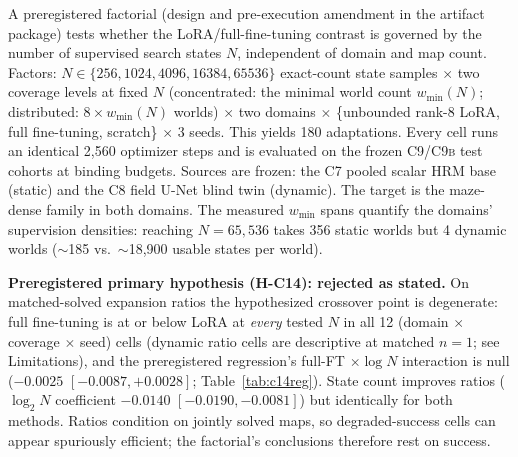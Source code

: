 \documentclass[letterpaper]{article} %
\newcommand{\stage}[1]{\textsc{#1}}
\begin{document}
A preregistered factorial (design and pre-execution amendment in the artifact package) tests whether the LoRA/full-fine-tuning contrast is governed by the number of supervised search states $N$, independent of domain and map count. Factors: $N \in \{256, 1024, 4096, 16384, 65536\}$ exact-count state samples $\times$ two coverage levels at fixed $N$ (concentrated: the minimal world count $w_{\min}(N)$; distributed: $8 \times w_{\min}(N)$ worlds) $\times$ two domains $\times$ \{unbounded rank-8 LoRA, full fine-tuning, scratch\} $\times$ 3 seeds. This yields 180 adaptations. Every cell runs an identical 2{,}560 optimizer steps and is evaluated on the frozen \stage{C9}/\stage{C9b} test cohorts at binding budgets. Sources are frozen: the \stage{C7} pooled scalar HRM base (static) and the \stage{C8} field U-Net blind twin (dynamic). The target is the maze-dense family in both domains. The measured $w_{\min}$ spans quantify the domains' supervision densities: reaching $N{=}65{,}536$ takes 356 static worlds but 4 dynamic worlds ($\sim$185 vs.\ $\sim$18{,}900 usable states per world).

\textbf{Preregistered primary hypothesis (H-C14): rejected as stated.} On matched-solved expansion ratios the hypothesized crossover point is degenerate: full fine-tuning is at or below LoRA at \emph{every} tested $N$ in all 12 (domain $\times$ coverage $\times$ seed) cells (dynamic ratio cells are descriptive at matched $n{=}1$; see Limitations), and the preregistered regression's full-FT $\times \log N$ interaction is null ($-0.0025$ $[-0.0087, +0.0028]$; Table~\ref{tab:c14reg}). State count improves ratios ($\log_2 N$ coefficient $-0.0140$ $[-0.0190, -0.0081]$) but identically for both methods. Ratios condition on jointly solved maps, so degraded-success cells can appear spuriously efficient; the factorial's conclusions therefore rest on success.
\end{document}
